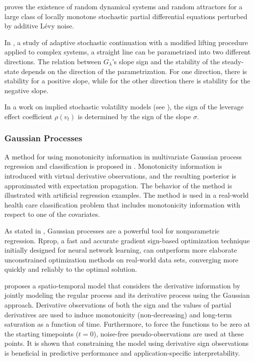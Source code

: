 \documentclass[11pt]{book}
\begin{document}
\cite{gess2020random} proves the existence of random dynamical systems
and random attractors for a large class of locally monotone stochastic
partial differential equations perturbed by additive Lévy noise.

In \cite{willers2020adaptive}, a study of adaptive stochastic continuation with a modified lifting procedure
applied to complex systems, a straight line can be parametrized
into two different directions. The relation between $G_{\lambda}$'s
slope sign and the stability of the steady-state depends on the direction
of the parametrization. For one direction, there is stability for a
positive slope, while for the other direction there is stability for the negative slope.

In a work on implied stochastic volatility models (see \cite{ait2021implied}), the sign of the leverage effect coefficient $\rho\left(v_{t}\right)$
is determined by the sign of the slope $\sigma$.


\subsubsection{Gaussian Processes}

A method for using monotonicity information in multivariate Gaussian
process regression and classification is proposed in \cite{riihimaki2010gaussian}.
Monotonicity information is introduced with virtual derivative observations,
and the resulting posterior is approximated with expectation propagation.
The behavior of the method is illustrated with artificial regression examples.
The method is used in a real-world health care classification problem
that includes monotonicity information with respect to one of the covariates.

As stated in \cite{blum2013optimization}, Gaussian processes are
a powerful tool for nonparametric regression. Rprop, a fast and accurate
gradient sign-based optimization technique initially designed for
neural network learning, can outperform more elaborate unconstrained
optimization methods on real-world data sets, converging more
quickly and reliably to the optimal solution.

\cite{riutort2019gaussian} proposes a spatio-temporal model that
considers the derivative information by jointly modeling the regular
process and its derivative process using the Gaussian approach. Derivative observations
of both the sign and the values of partial derivatives are used to
induce monotonicity (non-decreasing) and long-term saturation as a
function of time. Furthermore, to force the functions to be zero at
the starting timepoints ($t=0$), noise-free pseudo-observations are
used at these points. It is shown that constraining the model using derivative sign
observations is beneficial in predictive performance and application-specific
interpretability.
\end{document}
